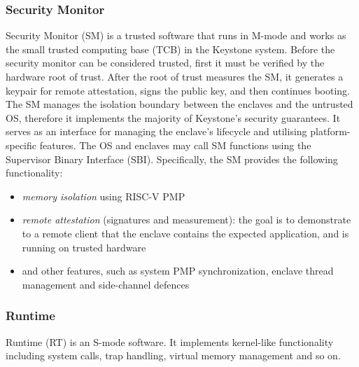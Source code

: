 \subsubsection{Security Monitor}
Security Monitor (SM) is a trusted software that runs in M-mode and works as the small trusted computing base (TCB) in the Keystone system. Before the security monitor can be considered trusted, first it must be verified by the hardware root of trust. After the root of trust measures the SM, it generates a keypair for remote attestation, signs the public key, and then continues booting. The SM manages the isolation boundary between the enclaves and the untrusted OS, therefore it implements the majority of Keystone's security guarantees.  It serves as an interface for managing the enclave's lifecycle and utilising platform-specific features. The OS and enclaves may call SM functions using the Supervisor Binary Interface (SBI). Specifically, the SM provides the following functionality:
\begin{itemize}
    \item \textit{memory isolation} using RISC-V PMP
    \item \textit{remote attestation} (signatures and measurement): the goal is to demonstrate to a remote client that the enclave contains the expected application, and is running on trusted hardware
    \item and other features, such as system PMP synchronization, enclave thread management and side-channel defences  
\end{itemize}

\subsubsection{Runtime}
Runtime (RT) is an S-mode software. It implements kernel-like functionality including system calls, trap handling, virtual memory management and so on.
